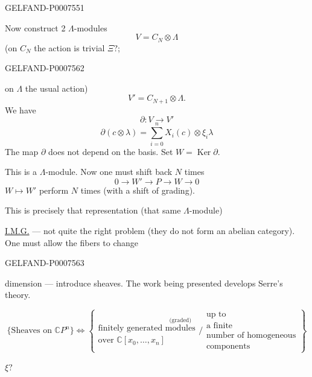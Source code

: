 \begin{GelfandAdjacentEvidence}{GELFAND-P000755}{1}

Now construct 2 \(\Lambda\)-modules
\begin{equation*}
V=C_N\otimes\Lambda
\tag{18}
\end{equation*}
(on \(C_N\) the action is trivial \(\Xi?\);
\end{GelfandAdjacentEvidence}
\begin{GelfandAdjacentEvidence}{GELFAND-P000756}{2}

on \(\Lambda\) the usual action)
\begin{equation*}
V'=C_{N+1}\otimes\Lambda.
\tag{\(18'\)}
\end{equation*}
We have
\begin{equation*}
\partial:V\longrightarrow V'
\tag{19}
\end{equation*}
\begin{equation*}
\partial(c\otimes\lambda)=\sum_{i=0}^n X_i(c)\otimes\xi_i\lambda
\tag{20}
\end{equation*}
The map \(\partial\) does not depend on the basis.
Set \(W=\operatorname{Ker}\partial\).

This is a \(\Lambda\)-module. Now one must shift back \(N\) times
\[
0\longrightarrow W'\longrightarrow P\longrightarrow W\longrightarrow0
\]
\(W\longmapsto W'\) perform \(N\) times
(with a shift of grading).

This is precisely that representation (that same \(\Lambda\)-module)

\underline{I.M.G.}\quad{}
--- not quite the right problem (they do not form an abelian category).
One must allow the fibers to change
\end{GelfandAdjacentEvidence}
\begin{GelfandAdjacentEvidence}{GELFAND-P000756}{3}

dimension --- introduce sheaves.
The work being presented develops Serre's theory.

\[
\{\text{Sheaves on }\mathbb CP^n\}\Leftrightarrow
\left\{
\begin{array}{l}
\text{finitely generated }\overset{\text{(graded)}}{\text{modules}}\\
\text{over }\mathbb C[x_0,\ldots,x_n]
\end{array}
\Big/
\begin{array}{l}
\text{up to}\\
\text{a finite}\\
\text{number of homogeneous}\\
\text{components}
\end{array}
\right\}
\]

\(\xi?\)
\end{GelfandAdjacentEvidence}
